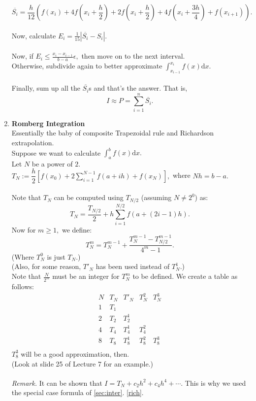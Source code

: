 \documentclass{article}
\begin{document}
\begin{enumerate}
	$\overline{S_i} = \dfrac{h}{12}\left(f(x_i) + 4f\left(x_i + \dfrac{h}{2}\right) + 2f\left(x_i + \dfrac{h}{2}\right) + 4f\left(x_i + \dfrac{3h}{4}\right) + f(x_{i+1})\right).$\\~\\
	Now, calculate $E_i = \frac{1}{15}|\overline{S_i} - S_i|.$\\~\\
	Now, if $E_i \le \frac{x_{i} - x_{i-1}}{b - a}\epsilon,$ then move on to the next interval.\\
	Otherwise, subdivide again to better approximate $\displaystyle\int_{x_{i-1}}^{x_i} f(x) \text{d}x.$\\~\\
	Finally, sum up all the $\overline{S_i}$s and that's the answer. That is,
	\[I \approx P = \sum_{i=1}^{n}\overline{S_i}.\]
	\item \textbf{Romberg Integration}\\
	Essentially the baby of composite Trapezoidal rule and Richardson extrapolation.\\
	Suppose we want to calculate $\displaystyle\int_{a}^{b} f(x) \text{d}x.$\\
	Let $N$ be a power of $2$.\\
	$T_N := \dfrac{h}{2}\left[f(x_0) + 2\displaystyle\sum_{i=1}^{N-1}f(a + ih) + f(x_N)\right],$ where $Nh = b-a.$\\~\\
	Note that $T_N$ can be computed using $T_{N/2}$ (assuming $N \neq 2^0$) as:
	\[T_N = \frac{T_{N/2}}{2} + h\sum_{i=1}^{N/2}f\left(a + (2i - 1)h\right).\]
	Now for $m \ge 1,$ we define:
	\[T^{m}_N = T^{m-1}_N + \frac{T^{m-1}_N - T^{m-1}_{N/2}}{4^m - 1}.\]
	(Where $T^{0}_N$ is just $T_N.$)\\
	(Also, for some reason, $T'_N$ has been used instead of $T^1_N$.)\\
	Note that $\frac{N}{2^m}$ must be an integer for $T^m_N$ to be defined.
	We create a table as follows:\\
		\[
		\begin{array}{c|c|c|c|c}
			N & T_N & T'_N & T^2_N & T^3_N\\
			\hline
			1 & T_1 & & &\\
			2 & T_2 & T^1_2 & & \\
			4 & T_4 & T^1_4 & T^2_4 & \\
			8 & T_8 & T^1_8 & T^2_8 & T^3_8 \\
		\end{array}
		\]
	$T^3_8$ will be a good approximation, then.\\
	(Look at slide 25 of Lecture 7 for an example.)\\~\\
	\emph{Remark.} It can be shown that $I = T_N + c_2h^2 + c_4h^4 + \cdots.$ This is why we used the special case formula of \ref{sec:inter}. \ref{rich}.
\end{enumerate}
\end{document}
